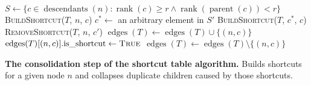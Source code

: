 \begin{algorithm}[h]
  \begin{algorithmic}[1]
  \small{
      \State $S \gets \{c \in \operatorname{descendants}(n) : \operatorname{rank}(c) \ge r \land  \operatorname{rank}(\operatorname{parent}(c)) < r\}$ 
        \textsc{BuildShortcut}($T$, $n$, $c$)
      \EndFor
        \State $c^* \gets$ an arbitrary element in $S'$ 
            \State \textsc{BuildShortcut}($T$, $c^*$, $c$)
          \EndFor
          \State \textsc{RemoveShortcut}($T$, $n$, $c'$)
        \EndFor
      \EndFor 
    \EndFunction
      \State $\operatorname{edges}(T) \gets \operatorname{edges}(T) \cup \{(n, c)\}$
      \State $\operatorname{edges}(T)[(n, c)]\text{.is\_shortcut} \gets \textsc{True}$
    \EndFunction
        \State $\operatorname{edges}(T) \gets \operatorname{edges}(T) \setminus \{(n, c)\}$
    \EndFunction
  }
  \end{algorithmic}
  \caption{\textbf{The consolidation step of the shortcut table algorithm.} \small Builds shortcuts for a given node $n$ and collapses duplicate children caused by those shortcuts. \vspace{-1.5em}}
  \label{alg:consolidation}
\end{algorithm}

